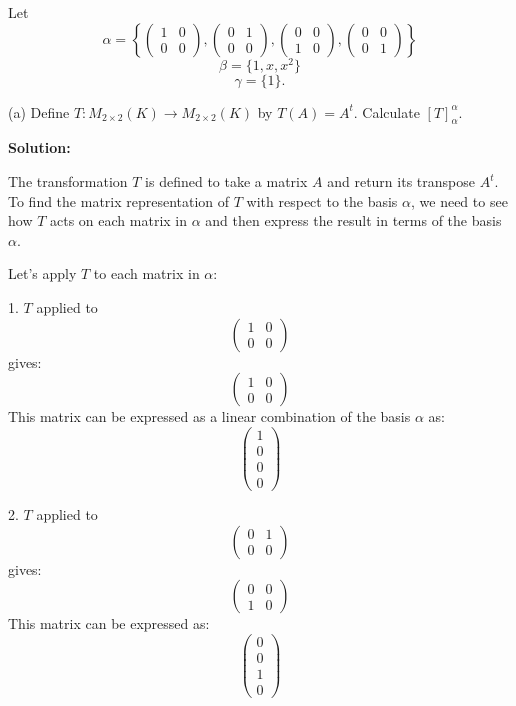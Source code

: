 \documentclass{article}
\begin{document}
	
	Let
	\[
	\alpha = 
	\left\{
	\begin{pmatrix}
		1 & 0 \\
		0 & 0
	\end{pmatrix},
	\begin{pmatrix}
		0 & 1 \\
		0 & 0
	\end{pmatrix},
	\begin{pmatrix}
		0 & 0 \\
		1 & 0
	\end{pmatrix},
	\begin{pmatrix}
		0 & 0 \\
		0 & 1
	\end{pmatrix}
	\right\}
	\]
	\[
	\beta = \{1, x, x^2\}
	\]
	\[
	\gamma = \{1\}.
	\]
	
	(a) Define \( T: M_{2\times2} (K) \to M_{2\times2} (K) \) by \( T(A) = A^t \). Calculate \([T]_{\alpha}^{\alpha}\).
	
	\textbf{Solution:}
	
	The transformation \( T \) is defined to take a matrix \( A \) and return its transpose \( A^t \). To find the matrix representation of \( T \) with respect to the basis \( \alpha \), we need to see how \( T \) acts on each matrix in \( \alpha \) and then express the result in terms of the basis \( \alpha \).
	
	Let's apply \( T \) to each matrix in \( \alpha \):
	
	1. \( T \) applied to 
	\[
	\begin{pmatrix}
		1 & 0 \\
		0 & 0
	\end{pmatrix}
	\]
	gives:
	\[
	\begin{pmatrix}
		1 & 0 \\
		0 & 0
	\end{pmatrix}
	\]
	This matrix can be expressed as a linear combination of the basis \( \alpha \) as:
	\[ \begin{pmatrix}
		1 \\
		0 \\
		0 \\
		0
	\end{pmatrix} \]
	
	2. \( T \) applied to 
	\[
	\begin{pmatrix}
		0 & 1 \\
		0 & 0
	\end{pmatrix}
	\]
	gives:
	\[
	\begin{pmatrix}
		0 & 0 \\
		1 & 0
	\end{pmatrix}
	\]
	This matrix can be expressed as:
	\[ \begin{pmatrix}
		0 \\
		0 \\
		1 \\
		0
	\end{pmatrix} \]
	
\end{document}
